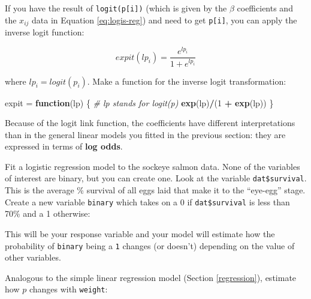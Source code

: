 \documentclass[]{book}
\newenvironment{Shaded}{\begin{snugshade}}{\end{snugshade}}
\newcommand{\KeywordTok}[1]{\textcolor[rgb]{0.13,0.29,0.53}{\textbf{#1}}}
\newcommand{\DecValTok}[1]{\textcolor[rgb]{0.00,0.00,0.81}{#1}}
\newcommand{\StringTok}[1]{\textcolor[rgb]{0.31,0.60,0.02}{#1}}
\newcommand{\CommentTok}[1]{\textcolor[rgb]{0.56,0.35,0.01}{\textit{#1}}}
\newcommand{\ControlFlowTok}[1]{\textcolor[rgb]{0.13,0.29,0.53}{\textbf{#1}}}
\newcommand{\OperatorTok}[1]{\textcolor[rgb]{0.81,0.36,0.00}{\textbf{#1}}}
\newcommand{\NormalTok}[1]{#1}
\theoremstyle{definition}
\theoremstyle{definition}
\theoremstyle{definition}
\theoremstyle{remark}
\begin{document}
If you have the result of \texttt{logit(p{[}i{]})} (which is given by
the \(\beta\) coefficients and the \(x_{ij}\) data in Equation
\eqref{eq:logis-reg}) and need to get \texttt{p{[}i{]}}, you can apply the
inverse logit function:

\begin{equation}
  expit(lp_i)=\frac{e^{lp_i}}{1 + e^{lp_i}}
\label{eq:expit}
\end{equation}

where \(lp_i = logit(p_i)\). Make a function for the inverse logit
transformation:

\begin{Shaded}
\begin{Highlighting}[]
\NormalTok{expit =}\StringTok{ }\ControlFlowTok{function}\NormalTok{(lp) \{  }\CommentTok{# lp stands for logit(p)}
  \KeywordTok{exp}\NormalTok{(lp)}\OperatorTok{/}\NormalTok{(}\DecValTok{1} \OperatorTok{+}\StringTok{ }\KeywordTok{exp}\NormalTok{(lp))}
\NormalTok{\}}
\end{Highlighting}
\end{Shaded}

Because of the logit link function, the coefficients have different
interpretations than in the general linear models you fitted in the
previous section: they are expressed in terms of \textbf{log odds}.

Fit a logistic regression model to the sockeye salmon data. None of the
variables of interest are binary, but you can create one. Look at the
variable \texttt{dat\$survival}. This is the average \% survival of all
eggs laid that make it to the ``eye-egg'' stage. Create a new variable
\texttt{binary} which takes on a 0 if \texttt{dat\$survival} is less
than 70\% and a 1 otherwise:

\begin{Shaded}
\end{Shaded}

This will be your response variable and your model will estimate how the
probability of \texttt{binary} being a \texttt{1} changes (or doesn't)
depending on the value of other variables.

Analogous to the simple linear regression model (Section
\ref{regression}), estimate how \(p\) changes with \texttt{weight}:
\end{document}
